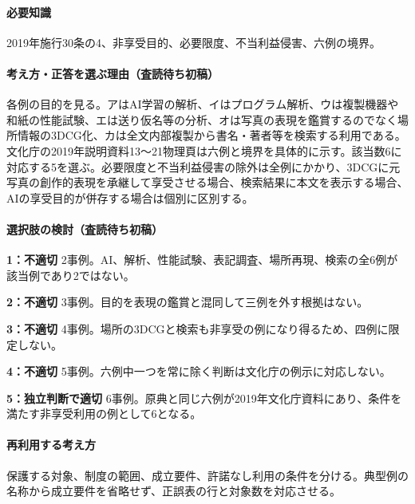 \paragraph{必要知識} 2019年施行30条の4、非享受目的、必要限度、不当利益侵害、六例の境界。

\paragraph{考え方・正答を選ぶ理由（査読待ち初稿）} 各例の目的を見る。アはAI学習の解析、イはプログラム解析、ウは複製機器や和紙の性能試験、エは送り仮名等の分析、オは写真の表現を鑑賞するのでなく場所情報の3DCG化、カは全文内部複製から書名・著者等を検索する利用である。文化庁の2019年説明資料13〜21物理頁は六例と境界を具体的に示す。該当数6に対応する5を選ぶ。必要限度と不当利益侵害の除外は全例にかかり、3DCGに元写真の創作的表現を承継して享受させる場合、検索結果に本文を表示する場合、AIの享受目的が併存する場合は個別に区別する。

\paragraph{選択肢の検討（査読待ち初稿）}\mbox{}\par

\noindent\textbf{1：不適切} 2事例。AI、解析、性能試験、表記調査、場所再現、検索の全6例が該当例であり2ではない。\par

\noindent\textbf{2：不適切} 3事例。目的を表現の鑑賞と混同して三例を外す根拠はない。\par

\noindent\textbf{3：不適切} 4事例。場所の3DCGと検索も非享受の例になり得るため、四例に限定しない。\par

\noindent\textbf{4：不適切} 5事例。六例中一つを常に除く判断は文化庁の例示に対応しない。\par

\noindent\textbf{5：独立判断で適切} 6事例。原典と同じ六例が2019年文化庁資料にあり、条件を満たす非享受利用の例として6となる。\par

\paragraph{再利用する考え方} 保護する対象、制度の範囲、成立要件、許諾なし利用の条件を分ける。典型例の名称から成立要件を省略せず、正誤表の行と対象数を対応させる。

